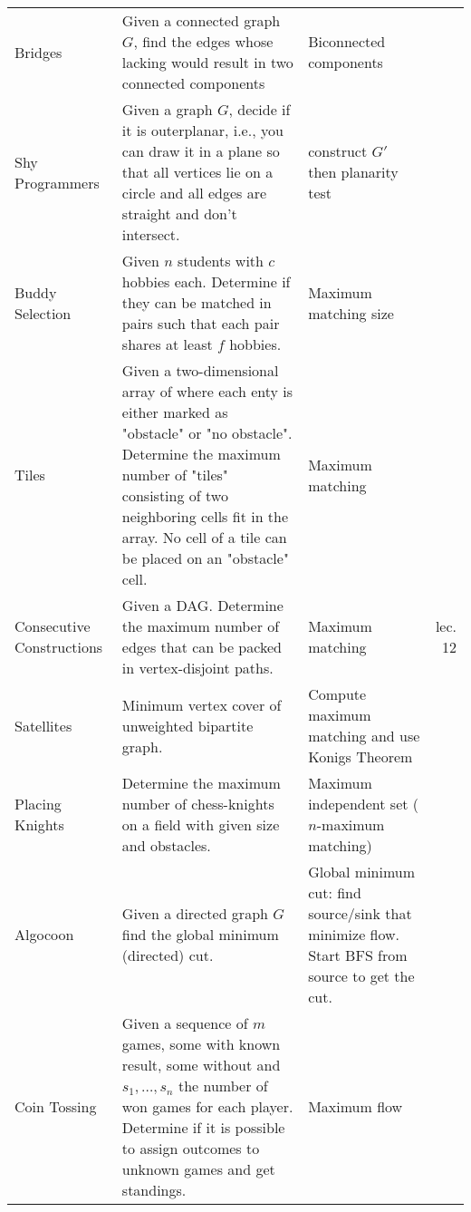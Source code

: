 \documentclass[a4paper, 10pt]{article}
\begin{document}
\begin{longtable}{ L{2cm} L{8cm} L{4cm} r}
        Bridges 
        & Given a connected graph $G$, find the edges whose lacking would result in two connected components         
        & Biconnected components &  \pageref{sec:bridges} \\

        Shy Programmers 
        & Given a graph $G$, decide if it is outerplanar, i.e., you can draw it in a plane so that all vertices lie on a 
            circle and all edges are straight and don't intersect.
        & construct $G'$ then planarity test &  \pageref{sec:shy_programmers} \\

        Buddy Selection
        & Given $n$ students with $c$ hobbies each. Determine if they can be matched in pairs such that each pair shares at least $f$ hobbies.
        & Maximum matching size &  \pageref{sec:buddy_selection} \\

        Tiles 
        & Given a two-dimensional array of where each enty is either marked as "obstacle" or "no obstacle". 
            Determine the maximum number of "tiles" consisting of two neighboring cells fit in the array. 
            No cell of a tile can be placed on an "obstacle" cell. 
            & Maximum matching &  \pageref{sec:tiles} \\

        Consecutive Constructions 
        & Given a DAG. 
        Determine the maximum number of edges that can be packed in vertex-disjoint paths.            
        & Maximum matching &  lec. 12 \\


        Satellites 
        & Minimum vertex cover of unweighted bipartite graph. 
        & Compute maximum matching and use Konigs Theorem &  \pageref{sec:satellites} \\

        Placing Knights 
        & Determine the maximum number of chess-knights on a field with given size and obstacles.
        & Maximum independent set ($n$-maximum matching) &  \pageref{sec:placing_knights} \\

        Algocoon 
        & Given a directed graph $G$ find the global minimum (directed) cut.
        & Global minimum cut: find source/sink that minimize flow. Start BFS from source to get the cut. &  \pageref{sec:algocoon} \\

        Coin Tossing
        & Given a sequence of $m$ games, some with known result, some without and $s_1,\dots,s_n$ the number of won games for each player.
            Determine if it is possible to assign outcomes to unknown games and get standings.
        & Maximum flow &  \pageref{sec:coin_tossing} \\


\end{longtable}
\end{document}
